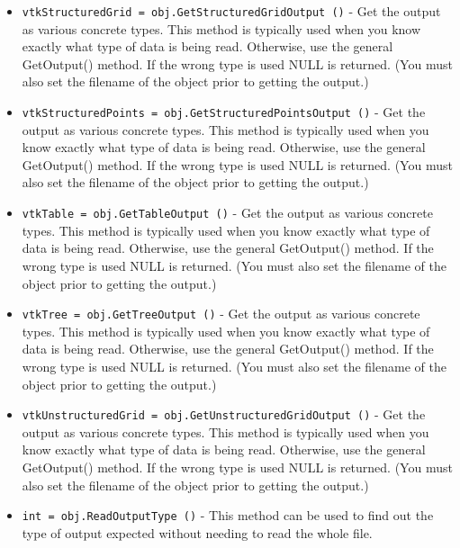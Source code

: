\begin{itemize}
\item  \verb|vtkStructuredGrid = obj.GetStructuredGridOutput ()| -  Get the output as various concrete types. This method is typically used
 when you know exactly what type of data is being read.  Otherwise, use
 the general GetOutput() method. If the wrong type is used NULL is
 returned.  (You must also set the filename of the object prior to
 getting the output.)

\item  \verb|vtkStructuredPoints = obj.GetStructuredPointsOutput ()| -  Get the output as various concrete types. This method is typically used
 when you know exactly what type of data is being read.  Otherwise, use
 the general GetOutput() method. If the wrong type is used NULL is
 returned.  (You must also set the filename of the object prior to
 getting the output.)

\item  \verb|vtkTable = obj.GetTableOutput ()| -  Get the output as various concrete types. This method is typically used
 when you know exactly what type of data is being read.  Otherwise, use
 the general GetOutput() method. If the wrong type is used NULL is
 returned.  (You must also set the filename of the object prior to
 getting the output.)

\item  \verb|vtkTree = obj.GetTreeOutput ()| -  Get the output as various concrete types. This method is typically used
 when you know exactly what type of data is being read.  Otherwise, use
 the general GetOutput() method. If the wrong type is used NULL is
 returned.  (You must also set the filename of the object prior to
 getting the output.)

\item  \verb|vtkUnstructuredGrid = obj.GetUnstructuredGridOutput ()| -  Get the output as various concrete types. This method is typically used
 when you know exactly what type of data is being read.  Otherwise, use
 the general GetOutput() method. If the wrong type is used NULL is
 returned.  (You must also set the filename of the object prior to
 getting the output.)

\item  \verb|int = obj.ReadOutputType ()| -  This method can be used to find out the type of output expected without
 needing to read the whole file.

\end{itemize}
